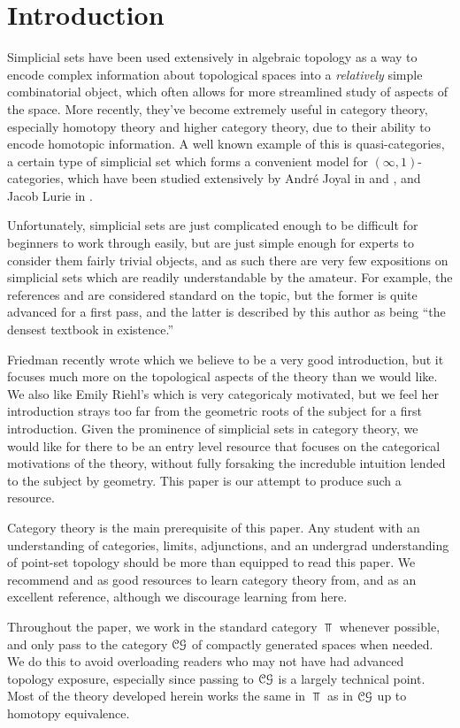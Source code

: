 \section{Introduction}

Simplicial sets have been used extensively in algebraic topology as a way to encode complex information about topological spaces into a \emph{relatively} simple combinatorial object, which often allows for more streamlined study of aspects of the space. More recently, they've become extremely useful in category theory, especially homotopy theory and higher category theory, due to their ability to encode homotopic information. A well known example of this is quasi-categories, a certain type of simplicial set which forms a convenient model for $(\infty ,1)$-categories, which have been studied extensively by Andr\'e Joyal in \cite{joyal1} and \cite{joyal2}, and Jacob Lurie in \cite{htt}.

Unfortunately, simplicial sets are just complicated enough to be difficult for beginners to work through easily, but are just simple enough for experts to consider them fairly trivial objects, and as such there are very few expositions on simplicial sets which are readily understandable by the amateur. For example, the references \cite{gj} and \cite{may} are considered standard on the topic, but the former is quite advanced for a first pass, and the latter is described by this author as being ``the densest textbook in existence.''

Friedman recently wrote \cite{fried} which we believe to be a very good introduction, but it focuses much more on the topological aspects of the theory than we would like. We also like Emily Riehl's \cite{sset} which is very categoricaly motivated, but we feel her introduction strays too far from the geometric roots of the subject for a first introduction. Given the prominence of simplicial sets in category theory, we would like for there to be an entry level resource that focuses on the categorical motivations of the theory, without fully forsaking the increduble intuition lended to the subject by geometry. This paper is our attempt to produce such a resource.

Category theory is the main prerequisite of this paper. Any student with an understanding of categories, limits, adjunctions, and an undergrad understanding of point-set topology should be more than equipped to read this paper. We recommend \cite{ctx} and \cite{lein} as good resources to learn category theory from, and \cite{ml} as an excellent reference, although we discourage learning from here.

Throughout the paper, we work in the standard category $\Top$ whenever possible, and only pass to the category $\mathcal{C}\mathcal{G}$ of compactly generated spaces when needed. We do this to avoid overloading readers who may not have had advanced topology exposure, especially since passing to $\mathcal{C}\mathcal{G}$ is a largely technical point. Most of the theory developed herein works the same in $\Top$ as in $\mathcal{C}\mathcal{G}$ up to homotopy equivalence.
